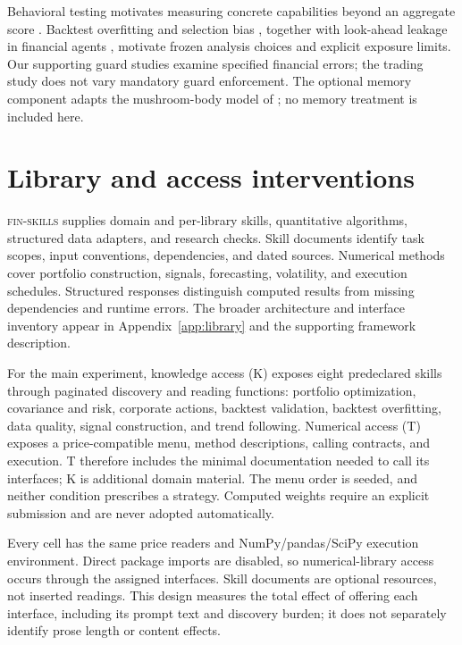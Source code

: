 \documentclass[11pt]{article}
\begin{document}
Behavioral testing motivates measuring concrete capabilities beyond an aggregate score
\cite{ribeiro2020checklist}. Backtest overfitting and selection bias
\cite{bailey2014deflated,bailey2017pbo}, together with look-ahead leakage in financial
agents \cite{li2025profit}, motivate frozen analysis choices and explicit exposure limits.
Our supporting guard studies examine specified financial errors; the trading study does
not vary mandatory guard enforcement. The optional memory component adapts the
mushroom-body model of \citet{huang2024memory}; no memory treatment is included here.

\section{Library and access interventions}
\label{sec:library}
\textsc{fin-skills} supplies domain and per-library skills, quantitative algorithms,
structured data adapters, and research checks. Skill documents identify task scopes,
input conventions, dependencies, and dated sources. Numerical methods cover portfolio
construction, signals, forecasting, volatility, and execution schedules. Structured
responses distinguish computed results from missing dependencies and runtime errors.
The broader architecture and interface inventory appear in
Appendix~\ref{app:library} and the supporting framework description.

For the main experiment, knowledge access (K) exposes eight predeclared skills through
paginated discovery and reading functions: portfolio optimization, covariance and risk,
corporate actions, backtest validation, backtest overfitting, data quality, signal
construction, and trend following. Numerical access (T) exposes a price-compatible menu,
method descriptions, calling contracts, and execution. T therefore includes the minimal
documentation needed to call its interfaces; K is additional domain material. The menu
order is seeded, and neither condition prescribes a strategy. Computed weights require an
explicit submission and are never adopted automatically.

Every cell has the same price readers and NumPy/pandas/SciPy execution environment.
Direct package imports are disabled, so numerical-library access occurs through the
assigned interfaces. Skill documents are optional resources, not inserted readings.
This design measures the total effect of offering each interface, including its prompt
text and discovery burden; it does not separately identify prose length or content effects.
\end{document}
